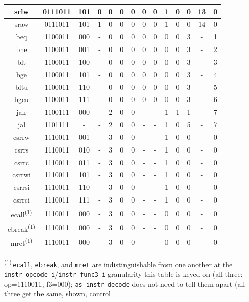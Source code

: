 \begin{longtable}{|c<{\raggedright}|c<{\raggedright}|c<{\raggedright}|c|c|c|c|c|c|c|c|c|c|c|}
\hline
srlw & 0111011 & 101 & 0 & 0 & 0 & 0 & 0 & 0 & 1 & 0 & 0 & 13 & 0 \\
\hline
sraw & 0111011 & 101 & 1 & 0 & 0 & 0 & 0 & 0 & 1 & 0 & 0 & 14 & 0 \\
\hline
beq & 1100011 & 000 & - & 0 & 0 & 0 & 0 & 0 & 0 & 0 & 3 & - & 1 \\
\hline
bne & 1100011 & 001 & - & 0 & 0 & 0 & 0 & 0 & 0 & 0 & 3 & - & 2 \\
\hline
blt & 1100011 & 100 & - & 0 & 0 & 0 & 0 & 0 & 0 & 0 & 3 & - & 3 \\
\hline
bge & 1100011 & 101 & - & 0 & 0 & 0 & 0 & 0 & 0 & 0 & 3 & - & 4 \\
\hline
bltu & 1100011 & 110 & - & 0 & 0 & 0 & 0 & 0 & 0 & 0 & 3 & - & 5 \\
\hline
bgeu & 1100011 & 111 & - & 0 & 0 & 0 & 0 & 0 & 0 & 0 & 3 & - & 6 \\
\hline
jalr & 1100111 & 000 & - & 2 & 0 & 0 & - & - & 1 & 1 & 1 & - & 7 \\
\hline
jal & 1101111 & - & - & 2 & 0 & 0 & - & - & 1 & 0 & 5 & - & 7 \\
\hline
csrrw & 1110011 & 001 & - & 3 & 0 & 0 & - & - & 1 & 0 & 0 & - & 0 \\
\hline
csrrs & 1110011 & 010 & - & 3 & 0 & 0 & - & - & 1 & 0 & 0 & - & 0 \\
\hline
csrrc & 1110011 & 011 & - & 3 & 0 & 0 & - & - & 1 & 0 & 0 & - & 0 \\
\hline
csrrwi & 1110011 & 101 & - & 3 & 0 & 0 & - & - & 1 & 0 & 0 & - & 0 \\
\hline
csrrsi & 1110011 & 110 & - & 3 & 0 & 0 & - & - & 1 & 0 & 0 & - & 0 \\
\hline
csrrci & 1110011 & 111 & - & 3 & 0 & 0 & - & - & 1 & 0 & 0 & - & 0 \\
\hline
ecall\textsuperscript{(1)} & 1110011 & 000 & - & 3 & 0 & 0 & - & - & 0 & 0 & 0 & - & 0 \\
\hline
ebreak\textsuperscript{(1)} & 1110011 & 000 & - & 3 & 0 & 0 & - & - & 0 & 0 & 0 & - & 0 \\
\hline
mret\textsuperscript{(1)} & 1110011 & 000 & - & 3 & 0 & 0 & - & - & 0 & 0 & 0 & - & 0
\label{tab:asDec05}
\end{longtable}
\noindent\footnotesize\textsuperscript{(1)}\,\texttt{ecall}, \texttt{ebreak},
and \texttt{mret} are indistinguishable from one another at the
\texttt{instr\_opcode\_i}/\texttt{instr\_func3\_i} granularity this table
is keyed on (all three: op=1110011, f3=000); \texttt{as\_instr\_decode}
does not need to tell them apart (all three get the same, shown, control
